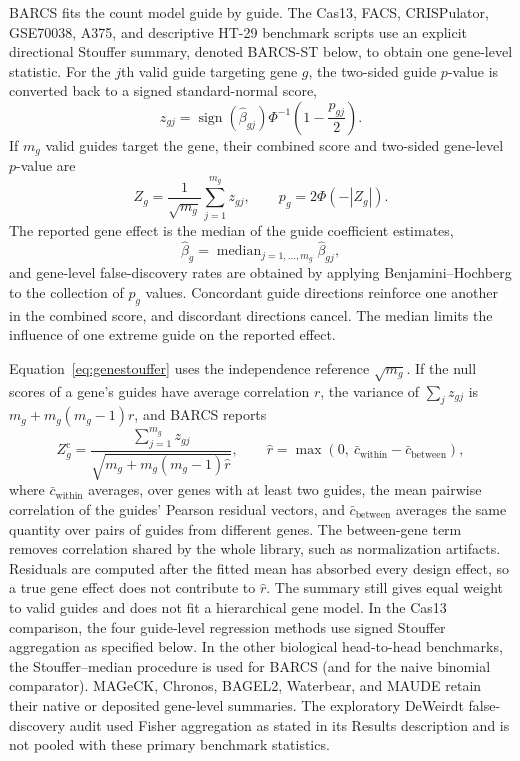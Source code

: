 BARCS fits the count model guide by guide.  The Cas13, FACS, CRISPulator, GSE70038,
A375, and descriptive HT-29 benchmark scripts use an explicit
directional Stouffer summary, denoted BARCS-ST below, to obtain one gene-level
statistic.  For the $j$th valid guide targeting gene $g$, the two-sided guide
$p$-value is converted back to a signed standard-normal score,
\begin{equation}
  z_{gj}
  =
  \operatorname{sign}(\widehat{\beta}_{gj})
  \Phi^{-1}\!\left(1-\frac{p_{gj}}{2}\right).
  \label{eq:signedz}
\end{equation}
If $m_g$ valid guides target the gene, their combined score and two-sided
gene-level $p$-value are
\begin{equation}
  Z_g=\frac{1}{\sqrt{m_g}}\sum_{j=1}^{m_g}z_{gj},
  \qquad
  p_g=2\Phi(-|Z_g|).
  \label{eq:genestouffer}
\end{equation}
The reported gene effect is the median of the guide coefficient estimates,
\begin{equation}
  \widehat{\beta}_g
  =\operatorname{median}_{j=1,\ldots,m_g}
    \widehat{\beta}_{gj},
  \label{eq:geneeffect}
\end{equation}
and gene-level false-discovery rates are obtained by applying
Benjamini--Hochberg to the collection of $p_g$ values.  Concordant guide directions reinforce one another in the combined score, and
discordant directions cancel.  The median limits the influence of one extreme
guide on the reported effect.

Equation~\eqref{eq:genestouffer} uses the independence reference
$\sqrt{m_g}$.  If the null scores of a gene's guides have average correlation
$r$, the variance of $\sum_j z_{gj}$ is $m_g+m_g(m_g-1)r$, and BARCS reports
\begin{equation}
  Z_g^{\mathrm{c}}=\frac{\sum_{j=1}^{m_g}z_{gj}}{\sqrt{m_g+m_g(m_g-1)\hat r}},
  \qquad
  \hat r=\max\!\left(0,\ \bar c_{\mathrm{within}}-\bar c_{\mathrm{between}}\right),
  \label{eq:genestouffer-corrected}
\end{equation}
where $\bar c_{\mathrm{within}}$ averages, over genes with at least two guides,
the mean pairwise correlation of the guides' Pearson residual vectors, and
$\bar c_{\mathrm{between}}$ averages the same quantity over pairs of guides
from different genes.  The between-gene term removes correlation shared by the
whole library, such as normalization artifacts.  Residuals are computed after
the fitted mean has absorbed every design effect, so a true gene effect does
not contribute to $\hat r$.  The summary still gives equal weight to valid
guides and does not fit a hierarchical gene model.  In the Cas13 comparison, the four guide-level regression methods use
signed Stouffer aggregation as specified below.  In the other biological
head-to-head benchmarks, the Stouffer--median procedure is used for BARCS (and
for the naive binomial comparator).  MAGeCK, Chronos, BAGEL2, Waterbear, and
MAUDE retain their native or deposited gene-level summaries.  The exploratory
DeWeirdt false-discovery audit used Fisher aggregation as stated in its
Results description and is not pooled with these primary benchmark statistics.
